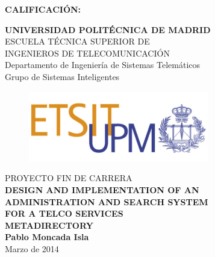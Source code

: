 {\large{\bf CALIFICACIÓN:}}
\pagestyle{empty}
\cleardoublepage
\vspace*{\baselineskip}
\begin{center}
	{\LARGE\rm\textbf{UNIVERSIDAD POLITÉCNICA DE MADRID}\\
	\vspace{1.0cm}
	 ESCUELA TÉCNICA SUPERIOR DE\\ INGENIEROS DE TELECOMUNICACIÓN
	  }  \\

	 {\Large\rm Departamento de Ingeniería de Sistemas Telemáticos\\
	 Grupo de Sistemas Inteligentes  }  \\

\begin{figure}[!htbp]
	\centering
    \includegraphics[width=0.7\textwidth]{img/logo_etsit.jpg}

\end{figure}
	\vspace{1.0cm}
	{{\LARGE\rm PROYECTO FIN DE CARRERA\\
	\vspace{2.0cm}
	 \textbf{DESIGN AND IMPLEMENTATION OF AN}\\	 
	 \textbf{ADMINISTRATION AND SEARCH SYSTEM}\\ 
	 \textbf{FOR A TELCO SERVICES}\\
	 \vspace{0.5cm}
	 \textbf{METADIRECTORY} }}  \\
	 
	 \vspace{1.0cm}
     \Large\rm\textbf{Pablo Moncada Isla}\\
	 \vspace{1.0cm}
	 Marzo de 2014
\end{center}  

%
